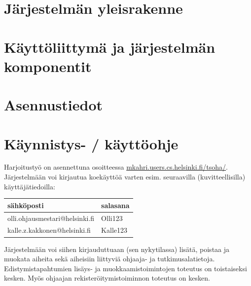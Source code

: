 \documentclass[11pt,a4paper,finnish,oneside]{article}
\begin{document}
\section{Järjestelmän yleisrakenne}
\section{Käyttöliittymä ja järjestelmän komponentit}
\section{Asennustiedot}
\section{Käynnistys- / käyttöohje}
\begin{par}
Harjoitustyö on asennettuna osoitteessa \href{http://mkahri.users.cs.helsinki.fi/tsoha/}{mkahri.users.cs.helsinki.fi/tsoha/}. Järjestelmään voi kirjautua koekäyttöä varten esim. seuraavilla (kuvitteellisilla) käyttäjätiedoilla:

\vspace{2em}

    \begin{tabular}
    { | p{8cm} | p{4cm} |}
    \hline
    sähköposti & salasana\\ \hline
    olli.ohjausmestari@helsinki.fi & Olli123 \\ \hline
    kalle.z.kakkonen@helsinki.fi & Kalle123 \\ \hline
    \end{tabular}

\vspace{2em}

Järjestelmään voi siihen kirjauduttuaan (sen nykytilassa) lisätä, poistaa ja muokata aiheita sekä aiheisiin liittyviä ohjaaja- ja tutkimusalatietoja. Edistymistapahtumien lisäys- ja muokkaamistoimintojen toteutus on toistaiseksi kesken. Myös ohjaajan rekisteröitymistoiminnon toteutus on kesken.

\end{par}\vspace{1em}
\end{document}
